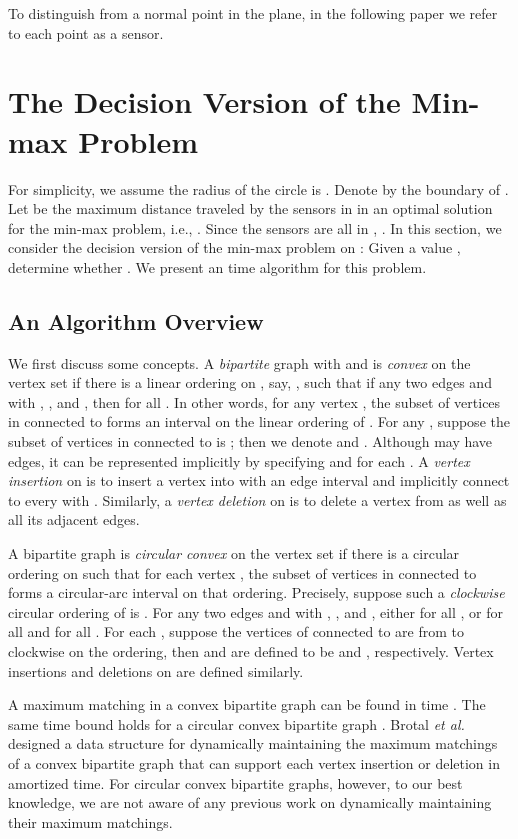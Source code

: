\documentclass[11pt]{article}
\begin{document}
To distinguish from a normal point in the plane, in the following
paper we refer to each
point  as a sensor.

\section{The Decision Version of the Min-max Problem}
\label{sec:decision}

For simplicity, we assume the radius of the circle  is . Denote by
 the boundary of . Let  be the
maximum distance traveled by the sensors in  in an optimal solution for
the min-max problem, i.e., . Since the sensors are all in , .
In this section, we consider the decision version of the min-max
problem on : Given a value , determine whether . We present an  time algorithm for this problem.

\subsection{An Algorithm Overview}

We first discuss some concepts. A
{\it bipartite} graph  with  and  is
{\it convex} on the vertex set  if there is a linear ordering
on , say, , such that if any two
edges  and  with ,
, and , then  for all . In other words, for any vertex , the subset of
vertices in  connected to  forms an interval on the linear
ordering of . For any , suppose the subset of vertices
in  connected to  is ; then we denote
 and . Although  may have 
edges, it can be represented implicitly by specifying  and
 for each .  A {\em vertex insertion} on  is
to insert a vertex  into  with an edge interval
 and implicitly connect  to every  with . Similarly, a {\em vertex
deletion} on  is to delete a vertex  from  as well as all its
adjacent edges.

A bipartite graph  is {\it circular convex} on
the vertex set  if there is a circular ordering on  such
that for each vertex , the subset of vertices in 
connected to  forms a circular-arc interval on that ordering. Precisely,
suppose such a {\em clockwise} circular ordering of  is .
For any two edges  and  with
, , and , either
 for all , or  for all  and  for all . For
each , suppose the vertices of  connected to  are
from  to  clockwise on the ordering, then  and
 are defined to be  and , respectively.
Vertex insertions and deletions on  are defined similarly.




A maximum matching in a convex bipartite graph can be found in
 time \cite{ref:GabowA85,ref:LipskiEf81,ref:SteinerA96}. The
same time bound holds for a circular convex bipartite graph
\cite{ref:LiangCi95}. Brotal {\em et al.}~\cite{ref:BrodalDy07} designed
a data structure for dynamically maintaining the maximum matchings of
a convex bipartite graph that can support each vertex insertion or
deletion in  amortized time. For circular convex
bipartite graphs, however, to our best knowledge, we are not aware of
any previous work on dynamically maintaining their maximum matchings.
\end{document}
